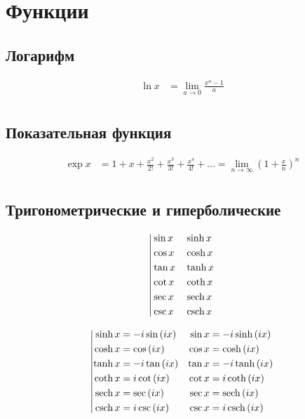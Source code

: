 
\section{Функции}

\subsection{Логарифм}

\begin{equation*} \begin{aligned}
\ln{x} &= \lim_{a \to 0} \frac{x^a - 1}{a} \\
\end{aligned} \end{equation*}

\subsection{Показательная функция}

\begin{equation*}
\begin{aligned}
\exp{x} &= 
  1
+ x
+ \frac{x^2}{2!}
+ \frac{x^3}{3!}
+ \frac{x^4}{4!}
+ \ldots
= \lim_{n \to \infty} \left(
  1 + \frac{x}{n}
  \right)^n \\
\end{aligned}
\end{equation*}

\subsection{Тригонометрические и гиперболические} %

\begin{equation*}
\left|
\begin{aligned}
&\sin{x} & &\sinh{x} \\
&\cos{x} & &\cosh{x} \\
&\tan{x} & &\tanh{x} \\
&\cot{x} & &\coth{x} \\
&\sec{x} & &\operatorname{sech}{x} \\
&\csc{x} & &\operatorname{csch}{x} \\
\end{aligned}
\right.
\end{equation*}

\begin{equation*}
\left|
\begin{aligned}
\sinh{x} &= - i \sin{(i x)} & \sin{x} &= - i \sinh{(i x)}  \\
\cosh{x} &= \cos{(i x)} & \cos{x} &= \cosh{(i x)} \\
\tanh{x} &= - i \tan{(i x)} & \tan{x} &= - i \tanh{(i x)} \\
\coth{x} &= i \cot{(i x)} & \cot{x} &= i \coth{(i x)} \\
\operatorname{sech}{x} &= \sec{(i x)} & \sec{x} &= \operatorname{sech}{(i x)} \\
\operatorname{csch}{x} &= i \csc{(i x)} & \csc{x} &= i \operatorname{csch}{(i x)} \\
\end{aligned}
\right.
\end{equation*}

